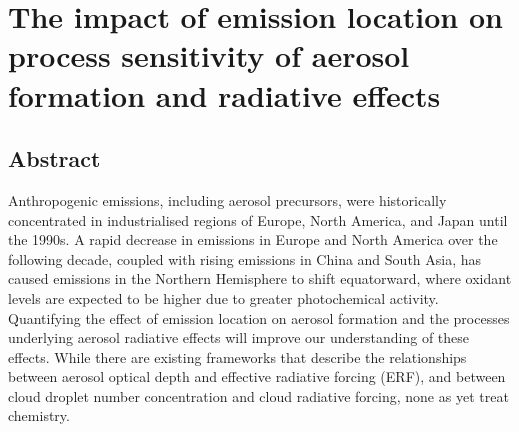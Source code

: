 \chapter{The impact of emission location on process sensitivity of aerosol formation and radiative effects}
\label{ch5:title}
\ifpdf
    \graphicspath{{Chapter5/Figs/Raster/}{Chapter3/Figs/PDF/}{Chapter5/Figs/}}
\else
    \graphicspath{{Chapter5/Figs/Vector/}{Chapter5/Figs/}}
\fi

\section*{Abstract}

Anthropogenic emissions, including aerosol precursors, were historically concentrated in industrialised regions of Europe, North America, and Japan until the 1990s. A rapid decrease in emissions in Europe and North America over the following decade, coupled with rising emissions in China and South Asia, has caused emissions in the Northern Hemisphere to shift equatorward, where oxidant levels are expected to be higher due to greater photochemical activity. Quantifying the effect of emission location on aerosol formation and the processes underlying aerosol radiative effects will improve our understanding of these effects. While there are existing frameworks that describe the relationships between aerosol optical depth and effective radiative forcing (ERF), and between cloud droplet number concentration and cloud radiative forcing, none as yet treat chemistry. 

